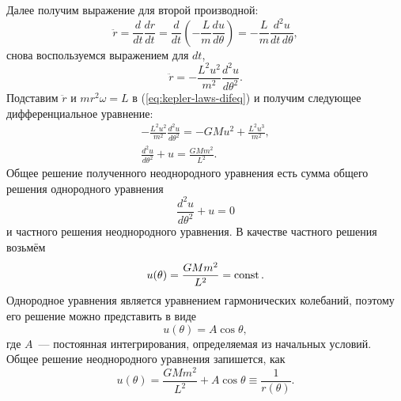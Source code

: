 Далее получим выражение для второй производной:
\begin{equation*}
    \ddot{r} = \frac{d}{dt} \frac{d r}{d t} = \frac{d}{dt} \left( - \frac{L}{m} \frac{d u}{d \theta} \right) = -\frac{L}{m} \frac{d^2 u}{dt \,d \theta},
\end{equation*}
снова воспользуемся выражением для $dt$,
\begin{equation*}
    \ddot{r} = - \frac{L^2 u^2}{m^2} \frac{d^2 u}{d \theta^2}.
\end{equation*}
Подставим $\ddot{r}$ и $mr^2 \omega = L$ в (\ref{eq:kepler-laws-difeq}) и получим следующее дифференциальное уравнение:
\begin{gather}
    - \frac{L^2 u^2}{m^2} \frac{d^2 u}{d \theta^2} = - GMu^2 + \frac{L^2 u^3}{m^2}, \nonumber\\
    \frac{d^2 u}{d \theta^2} + u = \frac{GM m^2}{L^2}. \label{eq:first-kepler-law-eq}
\end{gather}
Общее решение полученного неоднородного уравнения есть сумма общего решения однородного уравнения
\begin{equation*}
    \frac{d^2 u}{d \theta^2} + u = 0
\end{equation*}
и частного решения неоднородного уравнения. В качестве частного решения возьмём
\begin{equation*}
    u(\theta) = \frac{GM m^2}{L^2} = \operatorname{const}.
\end{equation*}
Однородное уравнения является уравнением гармонических колебаний, поэтому его решение можно представить в виде
\begin{equation*}
    u(\theta) = A \cos \theta,
\end{equation*}
где $A$~--- постоянная интегрирования, определяемая из начальных условий. Общее решение неоднородного уравнения запишется, как
\begin{equation}
    u(\theta) = \frac{GM m^2}{L^2} + A \cos \theta \equiv \frac{1}{r(\theta)}.
    \label{eq:solution-first-kepler-law-eq}
\end{equation}

